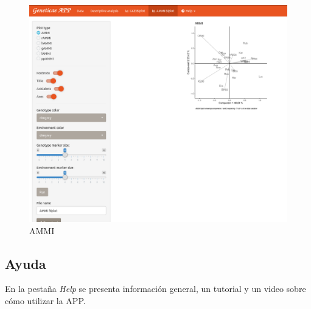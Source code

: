 \begin{figure}[H]
	\begin{center}
		\includegraphics[width=16cm]{./Graficos/AMMI_GE.png}
	\end{center}
	\caption{AMMI}
	\label{fig:fig4313}
\end{figure}


\subsection{Ayuda}

En la pestaña \emph{Help} se presenta información general, un tutorial y un video sobre  cómo utilizar la APP.

